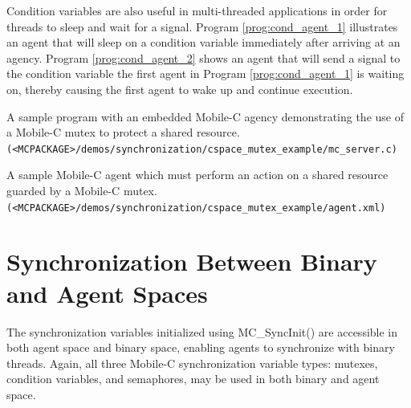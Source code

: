 \documentclass[11pt]{report}
\begin{document}
Condition variables are also useful in multi-threaded applications in order
for threads to sleep and wait for a signal. Program 
\vref{prog:cond_agent_1} illustrates an agent that will sleep on a condition
  variable immediately after arriving at an agency. Program 
\vref{prog:cond_agent_2} shows an agent that will send a signal to the condition
variable the first agent in Program \ref{prog:cond_agent_1} is waiting on, thereby
causing the first agent to wake up and continue execution.

\begin{Program}[!t]
\begin{center}
   {\footnotesize \linespread{1.0} }
\end{center}
\caption{A sample program with an embedded Mobile-C agency demonstrating the use of a 
Mobile-C mutex to protect a shared resource. \texttt{(<MCPACKAGE>/demos/synchronization/cspace\_mutex\_example/mc\_server.c)}}
\label{prog:binary_sync_example_server}
\end{Program}

\begin{Program}[!t]
\begin{center}
   {\footnotesize \linespread{1.0} }
\end{center}
\caption{A sample Mobile-C agent which must perform an action on a shared resource
guarded by a Mobile-C mutex. \texttt{(<MCPACKAGE>/demos/synchronization/cspace\_mutex\_example/agent.xml)}}
\label{prog:binary_sync_example_agent}
\end{Program}

\section{Synchronization Between Binary and Agent Spaces}
The synchronization variables initialized using MC\_SyncInit() are accessible
in both agent space and binary space, enabling agents to synchronize with 
binary threads. Again, all three Mobile-C synchronization variable types:
mutexes, condition variables, and semaphores, may be used in both
binary and agent space. 
\end{document}
